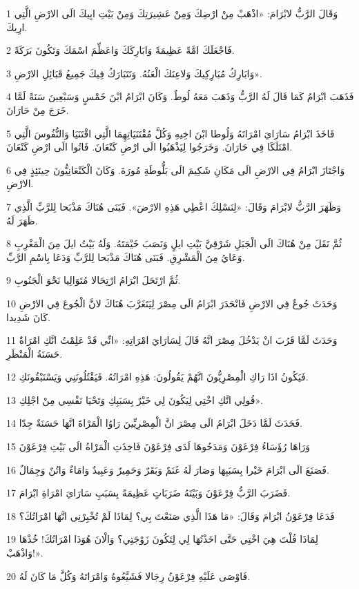 \par 1 وَقَالَ الرَّبُّ لابْرَامَ: «اذْهَبْ مِنْ ارْضِكَ وَمِنْ عَشِيرَتِكَ وَمِنْ بَيْتِ ابِيكَ الَى الارْضِ الَّتِي ارِيكَ.
\par 2 فَاجْعَلَكَ امَّةً عَظِيمَةً وَابَارِكَكَ وَاعَظِّمَ اسْمَكَ وَتَكُونَ بَرَكَةً.
\par 3 وَابَارِكُ مُبَارِكِيكَ وَلاعِنَكَ الْعَنُهُ. وَتَتَبَارَكُ فِيكَ جَمِيعُ قَبَائِلِ الارْضِ».
\par 4 فَذَهَبَ ابْرَامُ كَمَا قَالَ لَهُ الرَّبُّ وَذَهَبَ مَعَهُ لُوطٌ. وَكَانَ ابْرَامُ ابْنَ خَمْسٍ وَسَبْعِينَ سَنَةً لَمَّا خَرَجَ مِنْ حَارَانَ.
\par 5 فَاخَذَ ابْرَامُ سَارَايَ امْرَاتَهُ وَلُوطا ابْنَ اخِيهِ وَكُلَّ مُقْتَنَيَاتِهِمَا الَّتِي اقْتَنَيَا وَالنُّفُوسَ الَّتِي امْتَلَكَا فِي حَارَانَ. وَخَرَجُوا لِيَذْهَبُوا الَى ارْضِ كَنْعَانَ. فَاتُوا الَى ارْضِ كَنْعَانَ.
\par 6 وَاجْتَازَ ابْرَامُ فِي الارْضِ الَى مَكَانِ شَكِيمَ الَى بَلُّوطَةِ مُورَةَ. وَكَانَ الْكَنْعَانِيُّونَ حِينَئِذٍ فِي الارْضِ.
\par 7 وَظَهَرَ الرَّبُّ لابْرَامَ وَقَالَ: «لِنَسْلِكَ اعْطِي هَذِهِ الارْضَ». فَبَنَى هُنَاكَ مَذْبَحا لِلرَّبِّ الَّذِي ظَهَرَ لَهُ.
\par 8 ثُمَّ نَقَلَ مِنْ هُنَاكَ الَى الْجَبَلِ شَرْقِيَّ بَيْتِ ايلٍ وَنَصَبَ خَيْمَتَهُ. وَلَهُ بَيْتُ ايلَ مِنَ الْمَغْرِبِ وَعَايُ مِنَ الْمَشْرِقِ. فَبَنَى هُنَاكَ مَذْبَحا لِلرَّبِّ وَدَعَا بِاسْمِ الرَّبِّ.
\par 9 ثُمَّ ارْتَحَلَ ابْرَامُ ارْتِحَالا مُتَوَالِيا نَحْوَ الْجَنُوبِ.
\par 10 وَحَدَثَ جُوعٌ فِي الارْضِ فَانْحَدَرَ ابْرَامُ الَى مِصْرَ لِيَتَغَرَّبَ هُنَاكَ لانَّ الْجُوعَ فِي الارْضِ كَانَ شَدِيدا.
\par 11 وَحَدَثَ لَمَّا قَرُبَ انْ يَدْخُلَ مِصْرَ انَّهُ قَالَ لِسَارَايَ امْرَاتِهِ: «انِّي قَدْ عَلِمْتُ انَّكِ امْرَاةٌ حَسَنَةُ الْمَنْظَرِ.
\par 12 فَيَكُونُ اذَا رَاكِ الْمِصْرِيُّونَ انَّهُمْ يَقُولُونَ: هَذِهِ امْرَاتُهُ. فَيَقْتُلُونَنِي وَيَسْتَبْقُونَكِ.
\par 13 قُولِي انَّكِ اخْتِي لِيَكُونَ لِي خَيْرٌ بِسَبَبِكِ وَتَحْيَا نَفْسِي مِنْ اجْلِكِ».
\par 14 فَحَدَثَ لَمَّا دَخَلَ ابْرَامُ الَى مِصْرَ انَّ الْمِصْرِيِّينَ رَاوُا الْمَرْاةَ انَّهَا حَسَنَةٌ جِدّا.
\par 15 وَرَاهَا رُؤَسَاءُ فِرْعَوْنَ وَمَدَحُوهَا لَدَى فِرْعَوْنَ فَاخِذَتِ الْمَرْاةُ الَى بَيْتِ فِرْعَوْنَ
\par 16 فَصَنَعَ الَى ابْرَامَ خَيْرا بِسَبَبِهَا وَصَارَ لَهُ غَنَمٌ وَبَقَرٌ وَحَمِيرٌ وَعَبِيدٌ وَامَاءٌ وَاتُنٌ وَجِمَالٌ.
\par 17 فَضَرَبَ الرَّبُّ فِرْعَوْنَ وَبَيْتَهُ ضَرَبَاتٍ عَظِيمَةً بِسَبَبِ سَارَايَ امْرَاةِ ابْرَامَ.
\par 18 فَدَعَا فِرْعَوْنُ ابْرَامَ وَقَالَ: «مَا هَذَا الَّذِي صَنَعْتَ بِي؟ لِمَاذَا لَمْ تُخْبِرْنِي انَّهَا امْرَاتُكَ؟
\par 19 لِمَاذَا قُلْتَ هِيَ اخْتِي حَتَّى اخَذْتُهَا لِي لِتَكُونَ زَوْجَتِي؟ وَالْانَ هُوَذَا امْرَاتُكَ! خُذْهَا وَاذْهَبْ!».
\par 20 فَاوْصَى عَلَيْهِ فِرْعَوْنُ رِجَالا فَشَيَّعُوهُ وَامْرَاتَهُ وَكُلَّ مَا كَانَ لَهُ.


